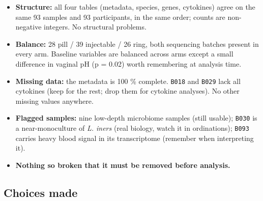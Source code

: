 \documentclass[
  letterpaper,
  DIV=11,
  numbers=noendperiod]{scrartcl}
\providecommand{\tightlist}{%
  \setlength{\itemsep}{0pt}\setlength{\parskip}{0pt}}
\begin{document}
\begin{itemize}
\tightlist
\item
  \textbf{Structure:} all four tables (metadata, species, genes,
  cytokines) agree on the same 93 samples and 93 participants, in the
  same order; counts are non-negative integers. No structural problems.
\item
  \textbf{Balance:} 28 pill / 39 injectable / 26 ring, both sequencing
  batches present in every arm. Baseline variables are balanced across
  arms except a small difference in vaginal pH (p = 0.02) worth
  remembering at analysis time.
\item
  \textbf{Missing data:} the metadata is 100 \% complete. \texttt{B018}
  and \texttt{B029} lack all cytokines (keep for the rest; drop them for
  cytokine analyses). No other missing values anywhere.
\item
  \textbf{Flagged samples:} nine low-depth microbiome samples (still
  usable); \texttt{B030} is a near-monoculture of \emph{L. iners} (real
  biology, watch it in ordinations); \texttt{B093} carries heavy blood
  signal in its transcriptome (remember when interpreting it).
\item
  \textbf{Nothing so broken that it must be removed before analysis.}
\end{itemize}

\subsection{Choices made}\label{choices-made}
\end{document}
